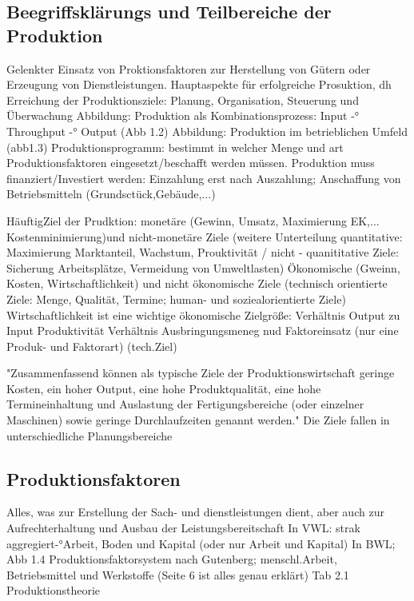 \documentclass[a4paper,12pt, german]{report}
\begin{document}
\subsection{Beegriffsklärungs und Teilbereiche der Produktion}

Gelenkter Einsatz von Proktionsfaktoren zur Herstellung von Gütern oder Erzeugung von Dienstleistungen. Hauptaspekte für erfolgreiche Prosuktion, dh Erreichung der Produktionsziele: Planung, Organisation, Steuerung und Überwachung 
Abbildung: Produktion als Kombinationsprozess: Input -° Throughput -° Output (Abb 1.2)
Abbildung: Produktion im betrieblichen Umfeld (abb1.3)
Produktionsprogramm: bestimmt in welcher Menge und art Produktionsfaktoren eingesetzt/beschafft werden müssen.
Produktion muss finanziert/Investiert werden: Einzahlung erst nach Auszahlung; Anschaffung von Betriebsmitteln (Grundsctück,Gebäude,...)
\cite{07}

HäuftigZiel der Prudktion: monetäre (Gewinn, Umsatz, Maximierung EK,... Kostenminimierung)und nicht-monetäre Ziele (weitere Unterteilung quantitative: Maximierung Marktanteil, Wachstum, Prouktivität / nicht - quanititative Ziele: Sicherung Arbeitsplätze, Vermeidung von Umweltlasten) 
Ökonomische (Gweinn, Kosten, Wirtschaftlichkeit) und nicht ökonomische Ziele (technisch orientierte Ziele: Menge, Qualität, Termine; human- und soziealorientierte Ziele)
Wirtschaftlichkeit ist eine wichtige ökonomische Zielgröße: Verhältnis Output zu Input
Produktivität Verhältnis Ausbringungsmeneg nud Faktoreinsatz (nur eine Produk- und Faktorart) (tech.Ziel)

"Zusammenfassend können als typische Ziele der Produktionswirtschaft geringe Kosten,
ein hoher Output, eine hohe Produktqualität, eine hohe Termineinhaltung und Auslastung
der Fertigungsbereiche (oder einzelner Maschinen) sowie geringe Durchlaufzeiten
genannt werden." Die Ziele fallen in unterschiedliche Planungsbereiche

\subsection{Produktionsfaktoren}

Alles, was zur Erstellung der Sach- und dienstleistungen dient, aber auch zur Aufrechterhaltung und Ausbau der Leistungsbereitschaft
In VWL: strak aggregiert-°Arbeit, Boden und Kapital (oder nur Arbeit und Kapital)
In BWL; Abb 1.4 Produktionsfaktorsystem nach Gutenberg; menschl.Arbeit, Betriebsmittel und Werkstoffe (Seite 6 ist alles genau erklärt)
Tab 2.1 Produktionstheorie
\end{document}
